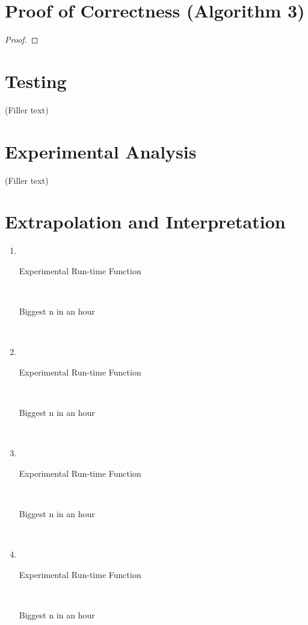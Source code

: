 \documentclass[paper=a4, fontsize=11pt]{scrartcl} %
\numberwithin{equation}{section} %
\numberwithin{figure}{section} %
\numberwithin{table}{section} %
\begin{document}
\section{Proof of Correctness (Algorithm 3)}
\begin{proof}
\end{proof}

\section{Testing}
(Filler text)

\section{Experimental Analysis}
(Filler text)

\section{Extrapolation and Interpretation}
\begin{enumerate}[label=\bfseries Algorithm \arabic*:]
    \item \hfill \\
    \begin{description}
        \item[Experimental Run-time Function] \hfill \\
        \item[Biggest n in an hour] \hfill \\
    \end{description}

    \item \hfill \\
    \begin{description}
        \item[Experimental Run-time Function] \hfill \\
        \item[Biggest n in an hour] \hfill \\
    \end{description}

    \item \hfill \\
    \begin{description}
        \item[Experimental Run-time Function] \hfill \\
        \item[Biggest n in an hour] \hfill \\
    \end{description}

    \item \hfill \\
    \begin{description}
        \item[Experimental Run-time Function] \hfill \\
        \item[Biggest n in an hour] \hfill \\
    \end{description}
\end{enumerate}
\end{document}
